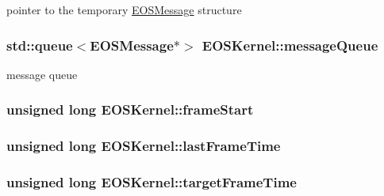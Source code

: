 pointer to the temporary \hyperlink{classEOSMessage}{EOSMessage} structure 

\hypertarget{structEOSKernel_e6cc8ecb01686b6284ec7fb8ce2d376f}{
\subsubsection[{messageQueue}]{\setlength{\rightskip}{0pt plus 5cm}std::queue$<${\bf EOSMessage}$\ast$$>$ {\bf EOSKernel::messageQueue}}}
\label{structEOSKernel_e6cc8ecb01686b6284ec7fb8ce2d376f}


message queue 

\hypertarget{structEOSKernel_200122496966050fd49e27dd74323093}{
\subsubsection[{frameStart}]{\setlength{\rightskip}{0pt plus 5cm}unsigned long {\bf EOSKernel::frameStart}}}
\label{structEOSKernel_200122496966050fd49e27dd74323093}


\hypertarget{structEOSKernel_288bf0407fc19109c67102df51a4774c}{
\subsubsection[{lastFrameTime}]{\setlength{\rightskip}{0pt plus 5cm}unsigned long {\bf EOSKernel::lastFrameTime}}}
\label{structEOSKernel_288bf0407fc19109c67102df51a4774c}


\hypertarget{structEOSKernel_96244c5052baeb3cb4915e655a12b50d}{
\subsubsection[{targetFrameTime}]{\setlength{\rightskip}{0pt plus 5cm}unsigned long {\bf EOSKernel::targetFrameTime}}}
\label{structEOSKernel_96244c5052baeb3cb4915e655a12b50d}


